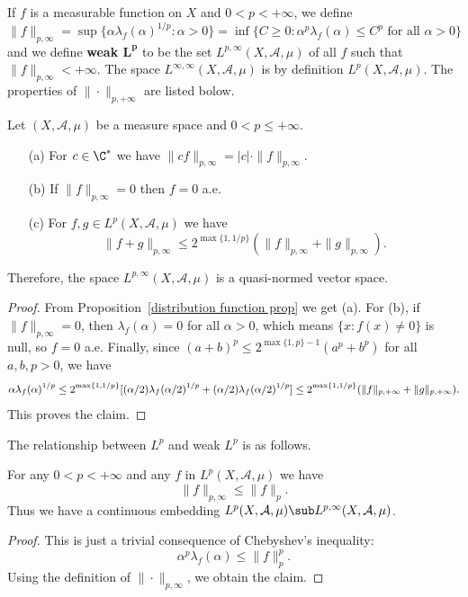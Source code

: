 If $f$ is a measurable function on $X$ and $0<p<+\infty$, we define
\[\|f\|_{p,\infty}=\sup\{\alpha\lambda_f(\alpha)^{1/p}:\alpha>0\}=\inf\{C\geq 0:\alpha^p\lambda_f(\alpha)\leq C^p\text{ for all $\alpha>0$}\}\]
and we define \textbf{weak $\bm{L^p}$} to be the set $L^{p,\infty}(X,\mathcal{A},\mu)$ of all $f$ such that $\|f\|_{p,\infty}<+\infty$. The space $L^{\infty,\infty}(X,\mathcal{A},\mu)$ is by definition $L^p(X,\mathcal{A},\mu)$. The properties of $\|\cdot\|_{p,+\infty}$ are listed bolow.
\begin{lemma}\label{weak L^p norm prop}
Let $(X,\mathcal{A},\mu)$ be a measure space and $0<p\leq+\infty$.
\begin{itemize}
\item[(a)] For $c\in\C^*$ we have $\|cf\|_{p,\infty}=|c|\cdot\|f\|_{p,\infty}$.
\item[(b)] If $\|f\|_{p,\infty}=0$ then $f=0$ a.e.
\item[(c)] For $f,g\in L^p(X,\mathcal{A},\mu)$ we have
\[\|f+g\|_{p,\infty}\leq 2^{\max\{1,1/p\}}(\|f\|_{p,\infty}+\|g\|_{p,\infty}).\]
\end{itemize}
Therefore, the space $L^{p,\infty}(X,\mathcal{A},\mu)$ is a quasi-normed vector space.
\end{lemma}
\begin{proof}
From Proposition~\ref{distribution function prop} we get (a). For (b), if $\|f\|_{p,\infty}=0$, then $\lambda_f(\alpha)=0$ for all $\alpha>0$, which means $\{x:f(x)\neq 0\}$ is null, so $f=0$ a.e. Finally, since $(a+b)^p\leq 2^{\max\{1,p\}-1}(a^p+b^p)$ for all $a,b,p>0$, we have
\begin{equation*}\small
\begin{aligned}
\alpha\lambda_f(\alpha)^{1/p}\leq 2^{\max\{1,1/p\}}[(\alpha/2)\lambda_f(\alpha/2)^{1/p}+(\alpha/2)\lambda_f(\alpha/2)^{1/p}]\leq 2^{\max\{1,1/p\}}(\|f\|_{p,+\infty}+\|g\|_{p,+\infty}).
\end{aligned}
\end{equation*}
This proves the claim.
\end{proof}
The relationship between $L^p$ and weak $L^p$ is as follows.
\begin{proposition}\label{L^p is weak L^p}
For any $0<p<+\infty$ and any $f$ in $L^p(X,\mathcal{A},\mu)$ we have
\[\|f\|_{p,\infty}\leq\|f\|_p.\]
Thus we have a continuous embedding $L^p(X,\mathcal{A},\mu)\sub L^{p,\infty}(X,\mathcal{A},\mu)$.
\end{proposition}
\begin{proof}
This is just a trivial consequence of Chebyshev's inequality:
\[\alpha^p\lambda_f(\alpha)\leq\|f\|_p^p.\]
Using the definition of $\|\cdot\|_{p,\infty}$, we obtain the claim.
\end{proof}
